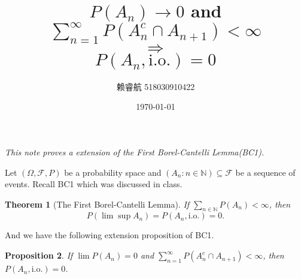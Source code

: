 \documentclass[a4paper, linespread=1.5]{article}
\newtheorem{theorem}{Theorem}
\newtheorem{proposition}[theorem]{Proposition}
\newcommand{\Natural}{\mathbb{N}}
\begin{document}
    \title{$P(A_n) \rightarrow 0$ and $\sum_{n = 1}^{\infty} P(A_n^c \cap A_{n + 1}) < \infty$ \\ $\Rightarrow$ \\ $P(A_n, \textrm{i.o.}) = 0$}
    \author{赖睿航 518030910422}
    \date{\today}
    \maketitle
    
    \textit{This note proves a extension of the First Borel-Cantelli Lemma(BC1).}
    
    \bigskip
    
    Let $(\Omega, \mathcal{F}, P)$ be a probability space and $(A_n \colon n \in \Natural) \subseteq \mathcal{F}$ be a sequence of events. Recall BC1 which was discussed in class.
    \begin{theorem}[The First Borel-Cantelli Lemma]
        If $\sum\limits_{n \in \Natural} P(A_n) < \infty$, then
        $$
        P(\lim \sup A_n) = P(A_n, \textrm{i.o.}) = 0.
        $$
    \end{theorem}
    And we have the following extension proposition of BC1.
    \begin{proposition}
        If $\lim P(A_n) = 0$ and $\sum\limits_{n = 1}^{\infty} P(A_n^c \cap A_{n + 1}) < \infty$, then $P(A_n, \textrm{i.o.}) = 0$. \cite{Chandra2012}
    \end{proposition}
\end{document}
